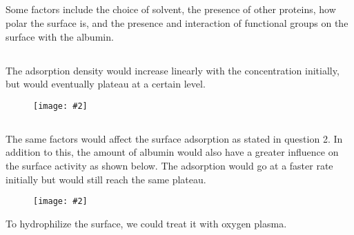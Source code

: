\documentclass{article}
\newcommand{\makefig}[2]{
\begin{figure}[h]
\centering
\texttt{[image: \#2]}
\end{figure}
}
\begin{document}
\subsection{}
Some factors include the choice of solvent, the presence of other proteins, how polar the surface is, and the presence and interaction of functional groups on the surface with the albumin.

\subsection{}
The adsorption density would increase linearly with the concentration initially, but would eventually plateau at a certain level.
\makefig{0.7}{P3.png}

\subsection{}
The same factors would affect the surface adsorption as stated in question 2. In addition to this, the amount of albumin would also have a greater influence on the surface activity as shown below. The adsorption would go at a faster rate initially but would still reach the same plateau.
\makefig{0.7}{P3b.png}
To hydrophilize the surface, we could treat it with oxygen plasma.
\end{document}
